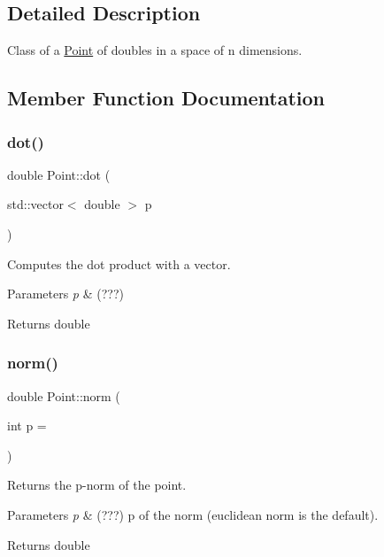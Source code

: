 \subsection{Detailed Description}
Class of a \hyperlink{class_point}{Point} of doubles in a space of n dimensions. 

\subsection{Member Function Documentation}
\mbox{\label{class_point_a9d8da6733d7e4110a62e8d0f82676761}} 
\subsubsection{\texorpdfstring{dot()}{dot()}}
{\footnotesize\ttfamily double Point\+::dot (\begin{DoxyParamCaption}\item[{std\+::vector$<$ double $>$}]{p }\end{DoxyParamCaption})}



Computes the dot product with a vector. 


\begin{DoxyParams}{Parameters}
{\em p} & (???) \\
\hline
\end{DoxyParams}
\begin{DoxyReturn}{Returns}
double 
\end{DoxyReturn}
\mbox{\label{class_point_aab64e3f0a9eecba00a1607eb4c7768c3}} 
\subsubsection{\texorpdfstring{norm()}{norm()}}
{\footnotesize\ttfamily double Point\+::norm (\begin{DoxyParamCaption}\item[{int}]{p = {} }\end{DoxyParamCaption})}



Returns the p-\/norm of the point. 


\begin{DoxyParams}{Parameters}
{\em p} & (???) p of the norm (euclidean norm is the default). \\
\hline
\end{DoxyParams}
\begin{DoxyReturn}{Returns}
double 
\end{DoxyReturn}


